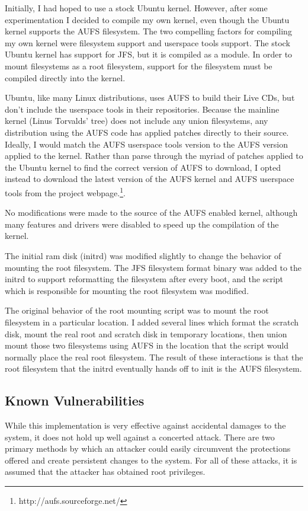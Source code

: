\documentclass[12pt]{article}
\begin{document}
Initially, I had hoped to use a stock Ubuntu kernel.  However, after some
experimentation I decided to compile my own kernel, even though the Ubuntu
kernel supports the AUFS filesystem.  The two compelling factors for compiling
my own kernel were filesystem support and userspace tools support.  The stock
Ubuntu kernel has support for JFS, but it is compiled as a module.  In order to
mount filesystems as a root filesystem, support for the filesystem must be
compiled directly into the kernel.

Ubuntu, like many Linux distributions, uses AUFS to build their Live CDs, but
don't include the userspace tools in their repositories.  Because the mainline
kernel (Linus Torvalds' tree) does not include any union filesystems, any
distribution using the AUFS code has applied patches directly to their source.
Ideally, I would match the AUFS userspace tools version to the AUFS version
applied to the kernel.  Rather than parse through the myriad of patches applied
to the Ubuntu kernel to find the correct version of AUFS to download, I opted
instead to download the latest version of the AUFS kernel and AUFS userspace
tools from the project webpage.\footnote{http://aufs.sourceforge.net/}.  

No modifications were made to the source of the AUFS enabled kernel, although
many features and drivers were disabled to speed up the compilation of the 
kernel.  

The initial ram disk (initrd) was modified slightly to change the behavior of mounting
the root filesystem.  The JFS filesystem format binary was added to the 
initrd to support reformatting the filesystem after every boot, and the 
script which is responsible for mounting the root filesystem was modified.

The original behavior of the root mounting script was to mount the root
filesystem in a particular location.  I added several lines which format the
scratch disk, mount the real root and scratch disk in temporary locations, then
union mount those two filesystems using AUFS in the location that the script
would normally place the real root filesystem.  The result of these
interactions is that the root filesystem that the initrd eventually hands off
to init is the AUFS filesystem.


\subsection{Known Vulnerabilities}
While this implementation is very effective against accidental damages to
the system, it does not hold up well against a concerted attack. There are two
primary methods by which an attacker could easily circumvent the protections
offered and create persistent changes to the system. For all of these attacks,
it is assumed that the attacker has obtained root privileges.
\end{document}
